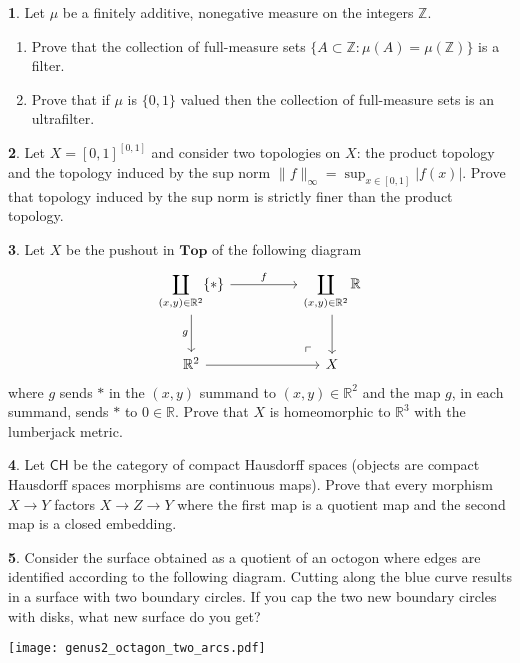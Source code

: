 \documentclass[11pt]{article}
\theoremstyle{definition}
\newtheorem{problem}{}
\newcommand{\bp}{\begin{problem}}
\newcommand{\ep}{\end{problem}\bigskip}
\theoremstyle{theorem}
\newcommand{\R}{\mathbb{R}}
\begin{document}
\pagestyle{fancy}
\fancyfoot[R,C,L]{}

\newcommand{\Top}{\mathbf{Top}}
\newcommand{\Set}{\mathbf{Set}}
\newcommand{\N}{\mathbb{N}}

\bp Let $\mu$ be a finitely additive, nonegative measure on the integers $\mathbb{Z}$. 
\begin{enumerate}[label=(\alph*)]
  \item  Prove that the collection of full-measure sets $\{A\subset \mathbb{Z}:\mu(A)=\mu(\mathbb{Z})\}$ is a filter.
\item Prove that if $\mu$ is $\{0,1\}$ valued then the collection of full-measure sets is an ultrafilter.
\end{enumerate}
\ep

\bp Let $X=[0,1]^{[0,1]}$ and consider two topologies on $X$:  the product topology and the topology induced by the sup norm $\|f\|_\infty = \sup_{x\in [0,1]}|f(x)|.$  Prove that topology induced by the sup norm is strictly finer than the product topology.  
\ep

\bp Let $X$ be the  pushout in $\Top$ of the following diagram
\[
\begin{tikzcd}[row sep=large, column sep=huge]
\displaystyle \coprod_{(x,y)\in\R^2} \{\ast \}
  \arrow[r,  "f"] \arrow[d, "g"'] 
& \displaystyle \coprod_{(x,y)\in\R^2} \R
  \arrow[d] \\
\mathbb{R}^2 \arrow[r] 
& X \arrow[ul, phantom, "\ulcorner", very near start] %
\end{tikzcd}
\]
where $g$ sends $\ast$ in the $(x,y)$ summand to $(x,y)\in \R^2$ and the map $g$, in each summand, sends $\ast$ to $0\in \R$.  Prove that $X$ is homeomorphic to $\R^3$ with the lumberjack metric.
\ep

\bp Let $\mathsf{CH}$ be the category of compact Hausdorff spaces (objects are compact Hausdorff spaces morphisms are continuous maps).  Prove that every morphism $X\to Y$ factors $X\to Z\to Y$ where the first map is a quotient map and the second map is a closed embedding.
\ep

\bp Consider the surface obtained as a quotient of an octogon where edges are identified according to the following diagram.  Cutting along the blue curve results in a surface with two boundary circles.  If you cap the two new boundary circles with disks, what new surface do you get?

\begin{center}
\texttt{[image: genus2\_octagon\_two\_arcs.pdf]}
\end{center}
\ep
\end{document}

